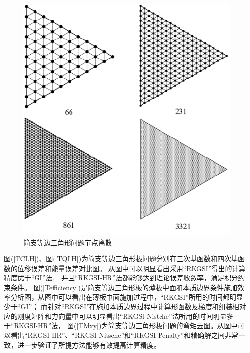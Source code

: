 \begin{figure}[H]
    \centering
    \includegraphics[scale=0.4]{figure/PHR/T/triangularmsh.png}
    \caption{简支等边三角形问题节点离散}\label{triangularmsh}
\end{figure}
图(\ref{TCLH})、图(\ref{TQLH})为简支等边三角形板问题分别在三次基函数和四次基函数的位移误差和能量误差对比图。
从图中可以明显看出采用“RKGSI”得出的计算精度优于“GI”法，
并且“RKGSI-HR”法都能够达到理论误差收敛率，满足积分约束条件。
图(\ref{Tefficiency})是简支等边三角形板的薄板中面和本质边界条件施加效率分析图，从图中可以看出在薄板中面施加过程中，“RKGSI”所用的时间都明显少于“GI”；
而针对“RKGSI”在施加本质边界过程中计算形函数及梯度和组装相对应的刚度矩阵和力向量中可以明显看出“RKGSI-Nistche”法所用的时间明显多于“RKGSI-HR”法，
图(\ref{TMxy})为简支等边三角形板问题的弯矩云图。从图中可以看出“RKGSI-HR”、“RKGSI-Nitsche”和“RKGSI-Penalty”和精确解之间非常一致，进一步验证了所提方法能够有效提高计算精度。
